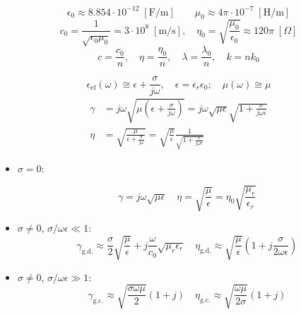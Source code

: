 \begin{myframe}
    \vspace{-1em}
    $$
        \epsilon_{0} \approx 8.854 \cdot 10^{-12} \; [\text{F/m}]
        \qquad
        \mu_{0} \approx 4\pi \cdot 10^{-7} \; [\text{H/m}]
    $$
    $$
        c_0 = \frac{1}{\sqrt{\epsilon_{0} \mu_{0}}} = 3 \cdot 10^8 \; [\text{m/s}], 
        \quad
        \eta_0 = \sqrt{\frac{\mu_{0}}{\epsilon_{0}}} \approx 120\pi\; [\Omega]
    $$
    $$
        c = \dfrac{c_0}{n}, \quad\eta = \dfrac{\eta_0}{n}, \quad\lambda = \dfrac{\lambda_0}{n}, \quad k = nk_0
    $$
\end{myframe}
\begin{myframe}
    $$
        \epsilon_{\text{ef}}(\omega) \cong \epsilon + \frac{\sigma}{j\omega},
        \quad
        \epsilon = \epsilon_r \epsilon_0;
        \quad
        \mu(\omega) \cong \mu
    $$
    $$
        \begin{aligned}
                \gamma &= j\omega\sqrt{\mu\left(\epsilon + \frac{\sigma}{j\omega}\right)} = j\omega\sqrt{\mu\epsilon}\sqrt{1+\frac{\sigma}{j\omega\epsilon}}\\
                \eta &= \sqrt{\frac{\mu}{\epsilon + \frac{\sigma}{j\omega}}} = \sqrt{\frac{\mu}{\epsilon}}\frac{1}{\sqrt{1+\frac{\sigma}{j\omega\epsilon}}}
        \end{aligned}
    $$
    \begin{itemize}[leftmargin=*,align=left,noitemsep]
        \item $\sigma = 0$:
    
        \vspace{-1em}
        $$
            \gamma = j\omega\sqrt{\mu\epsilon}\quad
            \eta = \sqrt{\frac{\mu}{\epsilon}} = \eta_0\sqrt{\frac{\mu_r}{\epsilon_r}}
        $$
        \item $\sigma \ne 0$, $\sigma/\omega\epsilon \ll 1$:
        $$
            \gamma_{\text{g.d.}} \approx \dfrac{\sigma}{2}\sqrt{\frac{\mu}{\epsilon}} + j\frac{\omega}{c_0}\sqrt{\mu_r\epsilon_r}\quad
            \eta_{\text{g.d.}} \approx \sqrt{\frac{\mu}{\epsilon}}\left(1+j\frac{\sigma}{2\omega\epsilon}\right)
        $$
        \item $\sigma \ne 0$, $\sigma/\omega\epsilon \gg 1$:
        $$
            \gamma_{\text{g.c.}} \approx\sqrt{\frac{\sigma\omega\mu}{2}}(1+j)\quad
            \eta_{\text{g.c.}} \approx \sqrt{\frac{\omega\mu}{2\sigma}}(1+j)
        $$
    \end{itemize}
\end{myframe}
